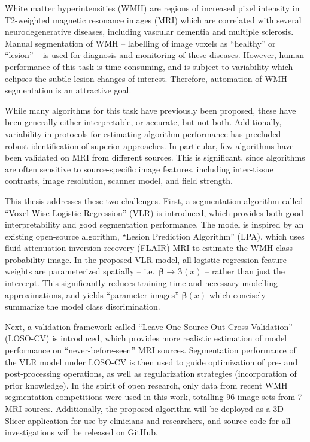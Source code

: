 White matter hyperintensities (WMH) are regions of increased pixel intensity
in T2-weighted magnetic resonance images (MRI)
which are correlated with several neurodegenerative diseases,
including vascular dementia and multiple sclerosis.
Manual segmentation of WMH -- labelling of image voxels as ``healthy'' or ``lesion'' --
is used for diagnosis and monitoring of these diseases.
However, human performance of this task is time consuming,
and is subject to variability which eclipses the subtle lesion changes of interest.
Therefore, automation of WMH segmentation is an attractive goal.
\par
While many algorithms for this task have previously been proposed,
these have been generally either interpretable, or accurate, but not both.
Additionally, variability in protocols for estimating algorithm performance
has precluded robust identification of superior approaches.
In particular, few algorithms have been validated on MRI from different sources.
This is significant, since algorithms are often sensitive to
source-specific image features, including
inter-tissue contrasts, image resolution, scanner model, and field strength.
\par
This thesis addresses these two challenges.
First, a segmentation algorithm called
``Voxel-Wise Logistic Regression'' (VLR) is introduced,
which provides both good interpretability and good segmentation performance.
The model is inspired by an existing open-source algorithm,
``Lesion Prediction Algorithm'' (LPA),
which uses fluid attenuation inversion recovery (FLAIR) MRI
to estimate the WMH class probability image.
In the proposed VLR model,
all logistic regression feature weights are parameterized spatially
-- i.e.\ $\bm{\beta} \rightarrow \bm{\beta}(x)$ --
rather than just the intercept.
This significantly reduces training time and necessary modelling approximations,
and yields ``parameter images'' $\bm{\beta}(x)$
which concisely summarize the model class discrimination.
\par
Next, a validation framework called
``Leave-One-Source-Out Cross Validation'' (LOSO-CV) is introduced,
which provides more realistic estimation of model performance
on ``never-before-seen'' MRI sources.
Segmentation performance of the VLR model under LOSO-CV
is then used to guide optimization of pre- and post-processing operations,
as well as regularization strategies (incorporation of prior knowledge).
In the spirit of open research,
only data from recent WMH segmentation competitions
were used in this work, totalling 96 image sets from 7 MRI sources.
Additionally, the proposed algorithm will be deployed as a 3D Slicer application
for use by clinicians and researchers,
and source code for all investigations will be released on GitHub.
